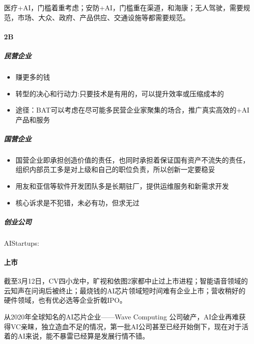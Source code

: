\documentclass[letterpaper,11pt,english]{sphinxmanual}
\begin{document}
医疗+AI，门槛着重考虑；安防+AI，门槛重在渠道，和海康；无人驾驶，需要规范，市场、大众、政府、产品供应、交通设施等都需要规范。


\paragraph{2B}
\label{\detokenize{chapter_project/AI_industry_analysis:b}}

\subparagraph{民营企业}
\label{\detokenize{chapter_project/AI_industry_analysis:id23}}\begin{itemize}
\item {} 
赚更多的钱

\item {} 
转型的决心和行动力:只要技术是有用的，可以提升效率或压缩成本的

\item {} 
途径：BAT可以考虑在尽可能多民营企业家聚集的场合，推广真实高效的+AI产品和服务

\end{itemize}


\subparagraph{国营企业}
\label{\detokenize{chapter_project/AI_industry_analysis:id24}}\begin{itemize}
\item {} 
国营企业即承担创造价值的责任，也同时承担着保证国有资产不流失的责任，组织内部员工多是对上级和自己的职位负责，所以创新一定要稳妥

\item {} 
用友和亚信等软件开发团队多是长期驻厂，提供运维服务和新需求开发

\item {} 
核心诉求是不犯错，未必有功，但求无过

\end{itemize}


\subparagraph{创业公司}
\label{\detokenize{chapter_project/AI_industry_analysis:id25}}
AIStartups: 


\paragraph{上市}
\label{\detokenize{chapter_project/AI_industry_analysis:id26}}
截至3月12日，CV四小龙中，旷视和依图2家都中止过上市进程；智能语音领域的云知声在问询后被终止；最烧钱的AI芯片领域短时间难有企业上市；营收稍好的硬件领域，也有优必选等企业折戟IPO。


从2020年全球知名的AI芯片企业——Wave Computing
公司破产，AI企业再难获得VC亲睐，独立造血不足的情况，第一批AI公司甚至已经开始倒下，现在对于活着的AI来说，能不暴雷已经算是发展行情不错。
\end{document}
